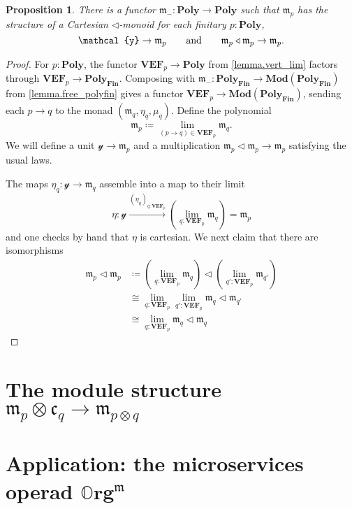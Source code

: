\documentclass[11pt, one side, article]{memoir}
\theoremstyle{definition}
\theoremstyle{plain}
\newtheorem{proposition}[definitionx]{Proposition}
\newcommand{\Cat}[1]{\mathbf{#1}}%
\newcommand{\To}[2][]{\xrightarrow[#1]{#2}}
\newcommand{\finset}{\Cat{Fin}}
\newcommand{\oorg}{\mathbb{O}\Cat{rg}}
\newcommand{\polyfin}{\poly_{\finset}}
\newcommand{\Mod}{\Cat{Mod}}
\newcommand{\yon}{\mathcal{y}}
\newcommand{\poly}{\Cat{Poly}}
\newcommand{\tri}{\mathbin{\triangleleft}}
\newcommand{\free}{\mathfrak{m}}
\newcommand{\cofree}{\mathfrak{c}}
\newcommand{\VEF}{\Cat{VEF}}
\newcommand{\qqand}{\qquad\text{and}\qquad}
\begin{document}
\begin{proposition}
There is a functor $\free_-\colon\poly\to\poly$ such that $\free_p$ has the structure of a Cartesian $\tri$-monoid for each finitary $p:\poly$,
\[
\yon\to\free_p
\qqand
\free_p\tri\free_p\to\free_p.
\qedhere
\]
\end{proposition}
\begin{proof}
For $p:\poly$, the functor $\VEF_p\to\poly$ from \cref{lemma.vert_lim} factors through $\VEF_p\to\polyfin$. Composing with $\free_-\colon\polyfin\to\Mod(\polyfin)$ from \cref{lemma.free_polyfin} gives a functor $\VEF_p\to\Mod(\polyfin)$,
sending each $p\to q$ to the monad $(\free_q,\eta_q,\mu_q)$. Define the polynomial
\[\free_p\coloneqq\lim_{(p\to q)\in\VEF_p}\free_q.\]
We will define a unit $\yon\to\free_p$ and a multiplication $\free_p\tri\free_p\to\free_p$ satisfying the usual laws. 

The maps $\eta_q\colon\yon\to\free_q$ assemble into a map to their limit
\[
  \eta\colon\yon\To{(\eta_q)_{q:\VEF_p}}
  \left(\lim_{q:\VEF_p}\free_q\right)=
  \free_p
\]
and one checks by hand that $\eta$ is cartesian. We next claim that there are isomorphisms
\begin{align*}
	\free_p\tri\free_p&\coloneqq
  \left(\lim_{q:\VEF_p}\free_q\right)\tri\left(\lim_{q':\VEF_p}\free_{q'}\right)\\&\cong
  \lim_{q:\VEF_p}\lim_{q':\VEF_p}\free_q\tri\free_{q'}\\&\cong
  \lim_{q:\VEF_p}\free_q\tri\free_q
\end{align*}
\end{proof}

\chapter{The module structure $\free_p\otimes\cofree_q\to\free_{p\otimes q}$}

\chapter{Application: the microservices operad $\oorg^\free$}

\printbibliography
\end{document}

